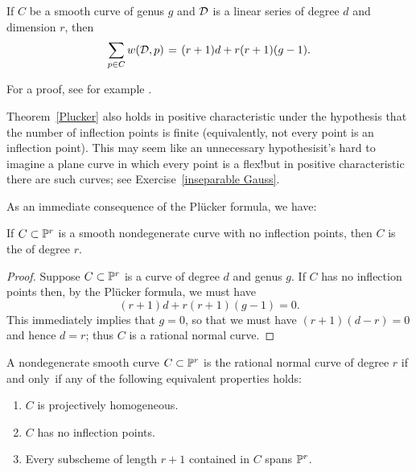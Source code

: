 \begin{theorem}\label{Plucker}
If $C$ be a smooth curve of genus $g$ and ${\mathcal D}$ is a
%
linear series of degree $d$ and dimension $r$, then
$$
\sum_{p \in C} w(\cD, p) \; = \; (r+1)d + r(r+1)(g-1).
$$
\end{theorem}

For a proof, see for example \cite[Theorem 7.13]{allthat}.

Theorem~\ref{Plucker} also holds in positive characteristic under the
%
hypothesis that the number of inflection points is finite (equivalently,
not every point is an inflection point). This may seem like an unnecessary
hypothesis\emdash it's hard to imagine a plane curve in which every
point is a flex!\emdash but in positive characteristic there are such curves;
see Exercise~\ref{inseparable Gauss}.

As an immediate consequence of the Pl\"ucker formula, we have:

\begin{corollary}\label{uninflected curves}
 If $C\subset {\mathbb P}^r$ is a smooth nondegenerate curve with no inflection
 points, then $C$ is the 
%
of degree $r$.
\unif
\end{corollary}

\begin{proof}
Suppose $C \subset {\mathbb P}^r$ is a curve of degree $d$ and genus $g$. If $C$
has no inflection points then, by the Pl\"ucker formula, we must have
$$
(r+1)d + r(r+1)(g-1) = 0.
$$
This immediately implies that $g=0$, so that we must have $(r+1)(d-r)
= 0$ and hence $d=r$; thus $C$ is a rational normal curve.
\unif
\end{proof}

\begin{corollary}
A nondegenerate smooth  curve $C\subset {\mathbb P}^{r}$ is the rational normal
curve
of degree $r$ if and only~if any of the following equivalent properties
holds:
\begin{enumerate}
\item $C$ is 
%
projectively homogeneous.
\item $C$ has no inflection points.
\item Every subscheme of length $r+1$ contained in $C$ spans ${\mathbb P}^{r}$.
\unif
\end{enumerate}
\end{corollary}

